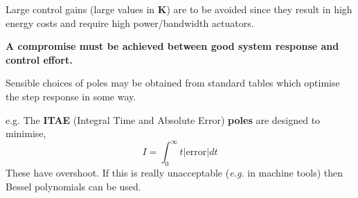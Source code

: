 Large control gains (large values in $\mathbf{K}$) are to be avoided since they result in high energy costs and require high power/bandwidth actuators.

\textbf{A compromise must be achieved between good system response and control effort.}

Sensible choices of poles may be obtained from standard tables which optimise the step response in some way.

e.g. The \textbf{ITAE} (Integral Time and Absolute Error) \textbf{poles} are designed to minimise,
\[
I=\int_0^\infty t|\mathrm{error}| dt
\]
These have overshoot. If this is really unacceptable (\emph{e.g.} in machine tools) then Bessel polynomials can be used.

\endinput

